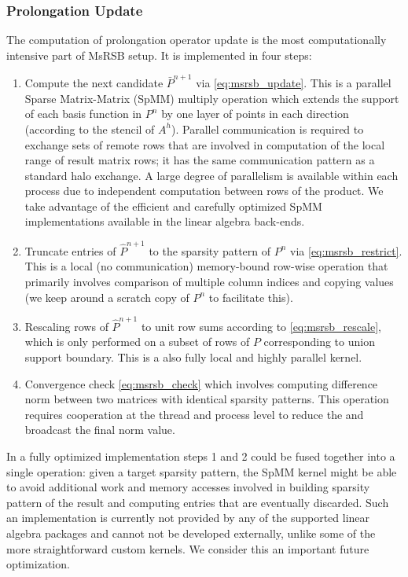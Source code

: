 \subsubsection{Prolongation Update}
\label{subsubsec:par_kernels_msrsb_update}

The computation of prolongation operator update is the most computationally intensive part of MsRSB setup.   It is implemented in four steps:
\begin{enumerate}
    \item Compute the next candidate $\bar{P}^{n+1}$ via \eqref{eq:msrsb_update}.   This is a parallel Sparse Matrix-Matrix (SpMM) multiply operation which extends the support of each basis function in $P^n$ by one layer of points in each direction (according to the stencil of $A^h$).   Parallel communication is required to exchange sets of remote rows that are involved in computation of the local range of result matrix rows; it has the same communication pattern as a standard halo exchange.   A large degree of parallelism is available within each process due to independent computation between rows of the product.   We take advantage of the efficient and carefully optimized SpMM implementations available in the linear algebra back-ends.
    \item Truncate entries of $\hat{P}^{n+1}$ to the sparsity pattern of $P^n$ via \eqref{eq:msrsb_restrict}.   This is a local (no communication) memory-bound row-wise operation that primarily involves comparison of multiple column indices and copying values (we keep around a scratch copy of $P^n$ to facilitate this).
    \item Rescaling rows of $\hat{P}^{n+1}$ to unit row sums according to \eqref{eq:msrsb_rescale}, which is only performed on a subset of rows of $P$ corresponding to union support boundary.   This is a also fully local and highly parallel kernel.
    \item Convergence check \eqref{eq:msrsb_check} which involves computing difference norm between two matrices with identical sparsity patterns.   This operation requires cooperation at the thread and process level to reduce the and broadcast the final norm value.
\end{enumerate}
In a fully optimized implementation steps 1 and 2 could be fused together into a single operation: given a target sparsity pattern, the SpMM kernel might be able to avoid additional work and memory accesses involved in building sparsity pattern of the result and computing entries that are eventually discarded.   Such an implementation is currently not provided by any of the supported linear algebra packages and cannot not be developed externally, unlike some of the more straightforward custom kernels.   We consider this an important future optimization.

